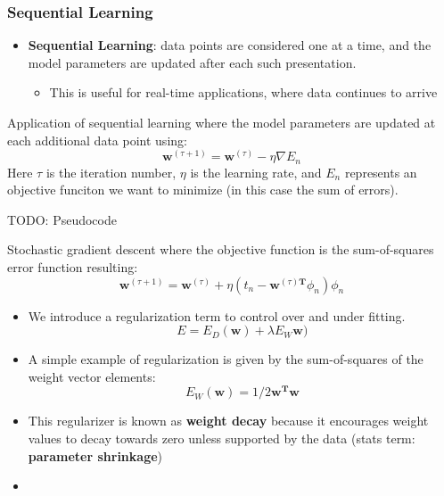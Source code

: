 \subsubsection{Sequential Learning}
\begin{itemize}[--]
	\item \textbf{Sequential Learning}: data points are considered one at a time, and the model parameters are updated after each such presentation.
	\begin{itemize}[--]
		\item This is useful for real-time applications, where data continues to arrive
	\end{itemize}
\end{itemize}

\begin{defn}
	Application of sequential learning where the model parameters are updated at each additional data point using:
	$$\mathbf{w}^{(\tau +1)}=\mathbf{w}^{(\tau )}-\eta \nabla E_n$$
	Here $\tau$ is the iteration number, $\eta$ is the learning rate, and $E_n$ represents an objective funciton we want to minimize (in this case the sum of errors).

	TODO: Pseudocode
\end{defn}

\begin{defn}
	Stochastic gradient descent where the objective function is the sum-of-squares error function resulting:
		$$\mathbf{w}^{(\tau +1)}=\mathbf{w}^{(\tau)} + \eta (t_n - \mathbf{w}^{(\tau)\mathbf{T}}\phi_n )\phi_n$$
\end{defn}

\begin{itemize}[--]
	\item We introduce a regularization term to control over and under fitting. $$E=E_D (\mathbf{w}) + \lambda E_W \mathbf{w})$$
	\item A simple example of regularization is given by the sum-of-squares of the weight vector elements: $$E_W (\mathbf{w}) = 1/2 \mathbf{w}^\mathbf{T}\mathbf{w}$$
	\item This regularizer is known as \textbf{weight decay} because it encourages weight values to decay towards zero unless supported by the data (stats term: \textbf{parameter shrinkage})
	\item 
\end{itemize}